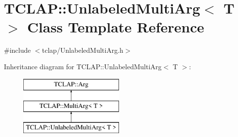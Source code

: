 \hypertarget{class_t_c_l_a_p_1_1_unlabeled_multi_arg}{}\section{T\+C\+L\+A\+P\+:\+:Unlabeled\+Multi\+Arg$<$ T $>$ Class Template Reference}
\label{class_t_c_l_a_p_1_1_unlabeled_multi_arg}


{\ttfamily \#include $<$tclap/\+Unlabeled\+Multi\+Arg.\+h$>$}

Inheritance diagram for T\+C\+L\+A\+P\+:\+:Unlabeled\+Multi\+Arg$<$ T $>$\+:\begin{figure}[H]
\begin{center}
\leavevmode
\includegraphics[height=3.000000cm]{class_t_c_l_a_p_1_1_unlabeled_multi_arg}
\end{center}
\end{figure}
